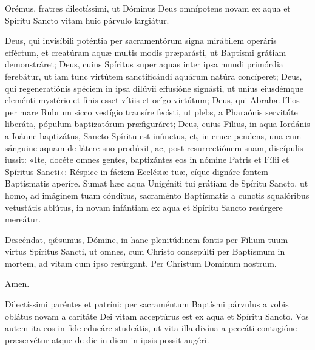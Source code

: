 
Orémus, fratres dilectíssimi, ut Dóminus Deus omnípotens novam ex aqua et
Spíritu Sancto vitam huic párvulo largiátur.


Deus,
qui invisíbili poténtia
per sacramentórum signa mirábilem operáris efféctum,
et creatúram aquæ multis modis præparásti,
ut Baptísmi grátiam demonstráret;
Deus, cuius Spíritus
super aquas inter ipsa mundi primórdia ferebátur,
ut iam tunc virtútem sanctificándi aquárum natúra concíperet;
Deus, qui regeneratiónis spéciem
in ipsa dilúvii effusióne signásti,
ut uníus eiusdémque eleménti mystério
et finis esset vítiis et orígo virtútum;
Deus, qui Abrahæ fílios
per mare Rubrum sicco vestígio transíre fecísti,
ut plebs, a Pharaónis servitúte liberáta,
pópulum baptizatórum præfiguráret;
Deus, cuius Fílius, in aqua Iordánis a Ioánne baptizátus,
Sancto Spíritu est inúnctus,
et, in cruce pendens,
una cum sánguine aquam de látere suo prodúxit,
ac, post resurrectiónem suam, discípulis iussit:
«Ite, docéte omnes gentes,
baptizántes eos in nómine Patris et Fílii et Spíritus Sancti»:
Réspice in fáciem Ecclésiæ tuæ,
eíque dignáre fontem Baptísmatis aperíre.
Sumat hæc aqua Unigéniti tui grátiam de Spíritu Sancto,
ut homo, ad imáginem tuam cónditus,
sacraménto Baptísmatis
a cunctis squalóribus vetustátis ablútus,
in novam infántiam
ex aqua et Spíritu Sancto resúrgere mereátur.


Descéndat, qǽsumus, Dómine,
in hanc plenitúdinem fontis
per Fílium tuum virtus Spíritus Sancti,
ut omnes, cum Christo consepúlti
per Baptísmum in mortem,
ad vitam cum ipso resúrgant.
Per Christum Dominum nostrum.

 Amen.



Dilectíssimi paréntes et patríni: per sacraméntum Baptísmi párvulus a vobis
oblátus novam a caritáte Dei vitam acceptúrus est ex aqua et Spíritu Sancto. 
Vos autem ita eos in fide educáre studeátis, ut vita illa divína a peccáti
contagióne præservétur atque de die in diem in ipsis possit augéri.

